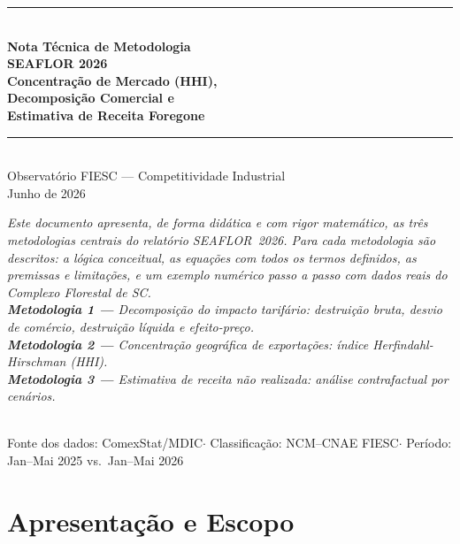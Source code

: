 \documentclass[12pt, a4paper]{article}
\begin{document}
\begin{titlepage}
  \centering
  \vspace*{1.5cm}
  {\color{azulFIESC}\rule{\linewidth}{2.5pt}}\\[0.5cm]
  {\LARGE\bfseries\color{azulFIESC}
    Nota Técnica de Metodologia\\[0.4cm]
    SEAFLOR 2026\\[0.3cm]
    \large Concentração de Mercado (HHI),\\
    Decomposição Comercial e\\
    Estimativa de Receita Foregone
  }\\[0.5cm]
  {\color{azulFIESC}\rule{\linewidth}{1pt}}\\[1.5cm]
  {\large\color{cinzaTexto}
    Observatório FIESC --- Competitividade Industrial\\[0.3cm]
    Junho de 2026
  }\\[2.5cm]
  \begin{minipage}{0.9\textwidth}
    \centering\itshape\color{cinzaTexto}
    Este documento apresenta, de forma didática e com rigor matemático,
    as três metodologias centrais do relatório SEAFLOR~2026.
    Para cada metodologia são descritos: a lógica conceitual,
    as equações com todos os termos definidos,
    as premissas e limitações, e um exemplo numérico
    passo a passo com dados reais do Complexo Florestal de SC.\\[0.8cm]
    \normalfont\small
    \textbf{Metodologia 1 ---} Decomposição do impacto tarifário:
      destruição bruta, desvio de comércio, destruição líquida e efeito-preço.\\[0.3cm]
    \textbf{Metodologia 2 ---} Concentração geográfica de exportações:
      índice Herfindahl-Hirschman (HHI).\\[0.3cm]
    \textbf{Metodologia 3 ---} Estimativa de receita não realizada:
      análise contrafactual por cenários.
  \end{minipage}\\[1.5cm]
  {\footnotesize\color{cinzaTexto}
    Fonte dos dados: ComexStat/MDIC\quad$\cdot$\quad
    Classificação: NCM--CNAE FIESC\quad$\cdot$\quad
    Período: Jan--Mai 2025 vs.\ Jan--Mai 2026
  }
\end{titlepage}

\tableofcontents
\newpage

\section{Apresentação e Escopo}
\end{document}
